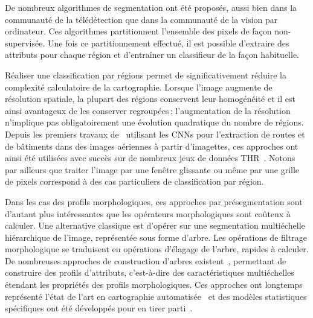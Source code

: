 De nombreux algorithmes de segmentation ont été proposés, aussi bien dans la communauté de la télédétection que dans la communauté de la vision par ordinateur. Ces algorithmes partitionnent l'ensemble des pixels de façon non-supervisée. Une fois ce partitionnement effectué, il est possible d'extraire des attributs pour chaque région et d'entraîner un classifieur de la façon habituelle.%

Réaliser une classification par régions permet de significativement réduire la complexité calculatoire de la cartographie. Lorsque l'image augmente de résolution spatiale, la plupart des régions conservent leur homogénéité et il est ainsi avantageux de les conserver regroupées\,: l'augmentation de la résolution n'implique pas obligatoirement une évolution quadratique du nombre de régions. Depuis les premiers travaux de~\citet{mnih_machine_2013} utilisant les \glspl{CNN} pour l'extraction de routes et de bâtiments dans des images aériennes à partir d'imagettes, ces approches ont ainsi été utilisées avec succès sur de nombreux jeux de données \gls{THR}~\cite{lagrange_benchmarking_2015,vargas_superpixel-based_2014}. Notons par ailleurs que traiter l'image par une fenêtre glissante ou même par une grille de pixels correspond à des cas particuliers de classification par région.

Dans les cas des profils morphologiques, ces approches par présegmentation sont d'autant plus intéressantes que les opérateurs morphologiques sont coûteux à calculer. Une alternative classique est d'opérer sur une segmentation multiéchelle hiérarchique de l'image, représentée sous forme d'arbre. Les opérations de filtrage morphologique se traduisent en opérations d'élagage de l'arbre, rapides à calculer. De nombreuses approches de construction d'arbres existent~\cite{bosilj_partition_2018}, permettant de construire des profils d'attributs, c'est-à-dire des caractéristiques multiéchelles étendant les propriétés des profils morphologiques. Ces approches ont longtemps représenté l'état de l'art en cartographie automatisée~\cite{pham_feature_2018} et des modèles statistiques spécifiques ont été développés pour en tirer parti~\cite{cui_scalable_2017}.

